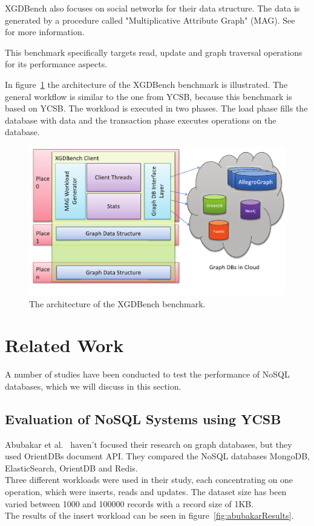XGDBench also focuses on social networks for their data structure.
The data is generated by a procedure called "Multiplicative Attribute Graph" (MAG).
See~\cite{Kim2012} for more information.

This benchmark specifically targets read,
update and graph traversal operations for its performance aspects.~\cite[366]{Dayarathna2012}

In figure~\ref{fig:XGDBenchArchitecture} the architecture of the XGDBench benchmark is illustrated.
The general workflow is similar to the one from YCSB,
because this benchmark is based on YCSB.
The workload is executed in two phases.
The load phase fills the database with data and the transaction phase executes operations on the database.

\begin{figure}[h!]
  \centering
  \includegraphics[width=.75\textwidth]{images/benchmarks/XGDBenchArchitecture}
  \caption{The architecture of the XGDBench benchmark.~\cite[367]{Dayarathna2012}}
  \label{fig:XGDBenchArchitecture}
\end{figure}

\pagebreak

\section{Related Work}
A number of studies have been conducted to test the performance of NoSQL databases,
which we will discuss in this section.

\subsection{Evaluation of NoSQL Systems using YCSB}
Abubakar et al.~\cite{Abubakar2014} haven't focused their research on graph databases,
but they used OrientDBs document API.
They compared the NoSQL databases MongoDB, ElasticSearch, OrientDB and Redis.\\
Three different workloads were used in their study,
each concentrating on one operation,
which were inserts, reads and updates.
The dataset size has been varied between 1000 and 100000 records with a record size of 1KB.\\
The results of the insert workload can be seen in figure~\ref{fig:abubakarResults}.

